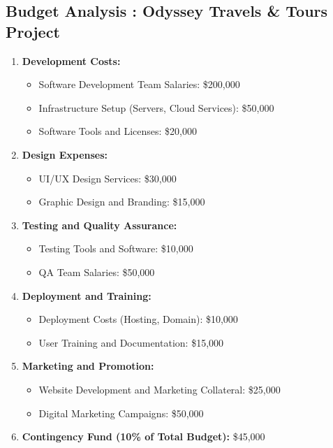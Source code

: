 \documentclass[12pt]{article}
\begin{document}
\subsection * { Budget Analysis : Odyssey Travels \& Tours Project }
\begin{enumerate}
    \item \textbf{Development Costs:}
    \begin{itemize}
        \item Software Development Team Salaries: \$200,000
        \item Infrastructure Setup (Servers, Cloud Services): \$50,000
        \item Software Tools and Licenses: \$20,000
    \end{itemize}
    
    \item \textbf{Design Expenses:}
    \begin{itemize}
        \item UI/UX Design Services: \$30,000
        \item Graphic Design and Branding: \$15,000
    \end{itemize}
    
    \item \textbf{Testing and Quality Assurance:}
    \begin{itemize}
        \item Testing Tools and Software: \$10,000
        \item QA Team Salaries: \$50,000
    \end{itemize}
    
    \item \textbf{Deployment and Training:}
    \begin{itemize}
        \item Deployment Costs (Hosting, Domain): \$10,000
        \item User Training and Documentation: \$15,000
    \end{itemize}
    
    \item \textbf{Marketing and Promotion:}
    \begin{itemize}
        \item Website Development and Marketing Collateral: \$25,000
        \item Digital Marketing Campaigns: \$50,000
    \end{itemize}
    
    \item \textbf{Contingency Fund (10\% of Total Budget):} \$45,000
\end{enumerate}
\end{document}
